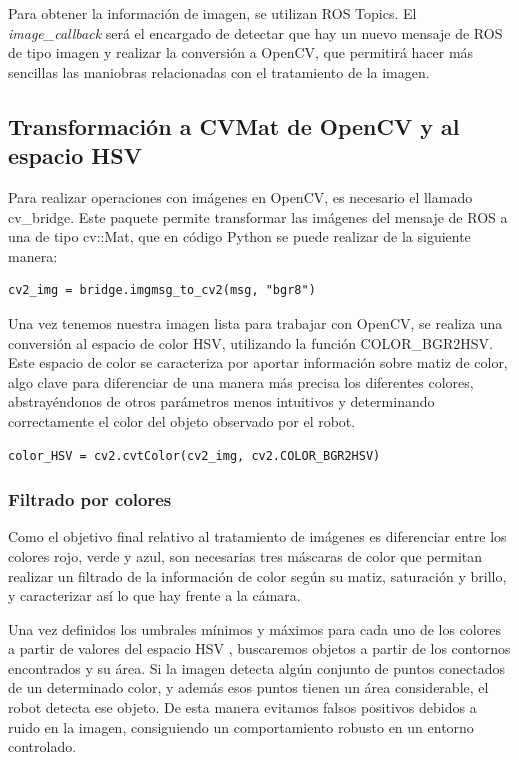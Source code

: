 \documentclass[12pt,spanish,chapterprefix, numbers=noenddot]{book}
\numberwithin{equation}{section}
\numberwithin{figure}{section}
\begin{document}
Para obtener la información de imagen, se utilizan ROS Topics. El \textit{image\_callback} será el encargado de detectar que hay un nuevo mensaje de ROS de tipo imagen y realizar la conversión a OpenCV, que permitirá hacer más sencillas las maniobras relacionadas con el tratamiento de la imagen.

\subsection{Transformación a CVMat de OpenCV y al espacio HSV}

Para realizar operaciones con imágenes en OpenCV, es necesario el llamado cv\_bridge. Este paquete permite transformar las imágenes del mensaje de ROS a una de tipo cv::Mat, que en código Python se puede realizar de la siguiente manera: 
	\begin{lstlisting}[frame=single]    
    cv2_img = bridge.imgmsg_to_cv2(msg, "bgr8")
	\end{lstlisting}
Una vez tenemos nuestra imagen lista para trabajar con OpenCV, se realiza una conversión al espacio de color HSV, utilizando la función COLOR\_BGR2HSV. Este espacio de color se caracteriza por aportar información sobre matiz de color, algo clave para diferenciar de una manera más precisa los diferentes colores, abstrayéndonos de otros parámetros menos intuitivos y determinando correctamente el color del objeto observado por el robot. 
	\begin{lstlisting}[frame=single] 
    color_HSV = cv2.cvtColor(cv2_img, cv2.COLOR_BGR2HSV)
	\end{lstlisting}
\subsubsection{Filtrado por colores}
Como el objetivo final relativo al tratamiento de imágenes es diferenciar entre los colores rojo, verde y azul, son necesarias tres máscaras de color que permitan realizar un filtrado de la información de color según su matiz, saturación y brillo, y caracterizar así lo que hay frente a la cámara. 

Una vez definidos los umbrales mínimos y máximos para cada uno de los colores a partir de valores del espacio HSV \cite{colores} \cite{py_colors}, buscaremos objetos a partir de los contornos encontrados y su área. Si la imagen detecta algún conjunto de puntos conectados de un determinado color, y además esos puntos tienen un área considerable, el robot detecta ese objeto. De esta manera evitamos falsos positivos debidos a ruido en la imagen, consiguiendo un comportamiento robusto en un entorno controlado. 
\end{document}

